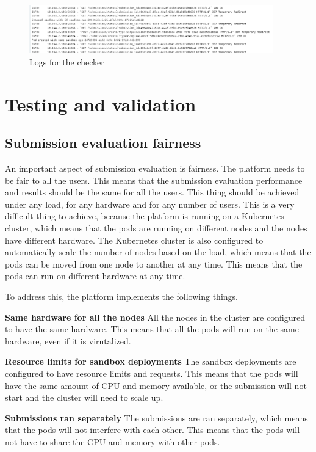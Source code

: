 \documentclass[12pt,a4paper]{report}
\begin{document}
\begin{figure}[h]
	\centering
	\includegraphics[width=400px]{./pics/argocd-logs.png}
	\caption{Logs for the checker}
	\label{fig:argocd-logs}
\end{figure}


\chapter{Testing and validation}
\section{Submission evaluation fairness}
An important aspect of submission evaluation is fairness. The platform needs to be fair to all the users. This means that the submission evaluation performance and results should be the same for all the users. This thing should be achieved under any load, for any hardware and for any number of users. This is a very difficult thing to achieve, because the platform is running on a Kubernetes cluster, which means that the pods are running on different nodes and the nodes have different hardware. The Kubernetes cluster is also configured to automatically scale the number of nodes based on the load, which means that the pods can be moved from one node to another at any time. This means that the pods can run on different hardware at any time.

To address this, the platform implements the following things.

\textbf{Same hardware for all the nodes}
All the nodes in the cluster are configured to have the same hardware. This means that all the pods will run on the same hardware, even if it is virutalized.

\textbf{Resource limits for sandbox deployments}
The sandbox deployments are configured to have resource limits and requests. This means that the pods will have the same amount of CPU and memory available, or the submission will not start and the cluster will need to scale up.

\textbf{Submissions ran separately}
The submissions are ran separately, which means that the pods will not interfere with each other. This means that the pods will not have to share the CPU and memory with other pods.
\end{document}
